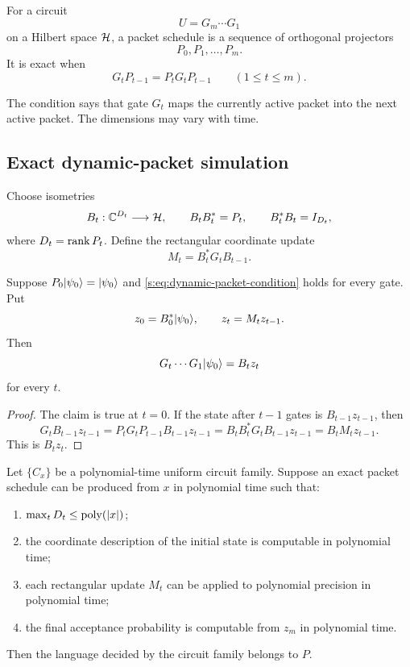 \begin{definition}
For a circuit
\[
U=G_m\cdots G_1
\]
on a Hilbert space $\mathcal H$, a packet schedule is a sequence of orthogonal projectors
\[
P_0,P_1,\ldots,P_m.
\]
It is exact when
\begin{equation}
G_tP_{t-1}=P_tG_tP_{t-1}
\qquad(1\le t\le m).
\label{s:eq:dynamic-packet-condition}
\end{equation}
\end{definition}

The condition says that gate $G_t$ maps the currently active packet into the next active packet. The dimensions may vary with time.

\subsection{Exact dynamic-packet simulation}
Choose isometries
\[
B_t:\mathbb C^{D_t}\longrightarrow\mathcal H,
\qquad
B_tB_t^*=P_t,
\qquad
B_t^*B_t=I_{D_t},
\]
where $D_t=\operatorname{rank} P_t$. Define the rectangular coordinate update
\begin{equation}
M_t=B_t^*G_tB_{t-1}.
\label{s:eq:dynamic-coordinate-update}
\end{equation}

\begin{theorem}
\label{s:thm:dynamic-packet}
Suppose $P_0\lvert \psi_0\rangle=\lvert \psi_0\rangle$ and \cref{s:eq:dynamic-packet-condition} holds for every gate. Put
\[
z_0=B_0^*\lvert \psi_0\rangle,
\qquad
z_t=M_tz_{t-1}.
\]
Then
\[
G_t\cdots G_1\lvert \psi_0\rangle=B_tz_t
\]
for every $t$.
\end{theorem}

\begin{proof}
The claim is true at $t=0$. If the state after $t-1$ gates is $B_{t-1}z_{t-1}$, then
\[
G_tB_{t-1}z_{t-1}
=P_tG_tP_{t-1}B_{t-1}z_{t-1}
=B_tB_t^*G_tB_{t-1}z_{t-1}
=B_tM_tz_{t-1}.
\]
This is $B_tz_t$.
\end{proof}

\begin{theorem}
\label{s:thm:moving-packet-collapse}
Let $\{C_x\}$ be a polynomial-time uniform circuit family. Suppose an exact packet schedule can be produced from $x$ in polynomial time such that:
\begin{enumerate}
\item $\max_tD_t\le\operatorname{poly}(|x|)$;
\item the coordinate description of the initial state is computable in polynomial time;
\item each rectangular update $M_t$ can be applied to polynomial precision in polynomial time;
\item the final acceptance probability is computable from $z_m$ in polynomial time.
\end{enumerate}
Then the language decided by the circuit family belongs to $P$.
\end{theorem}


